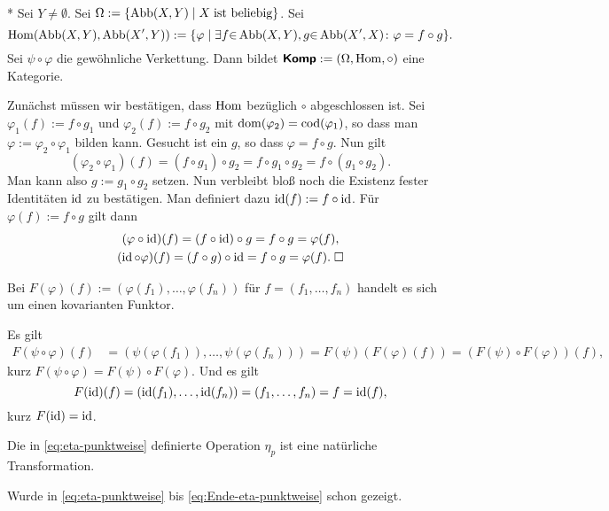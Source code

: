 \begin{Satz}\mbox{}\\*
Sei $Y\ne\emptyset$. Sei $\Omega:=\{\operatorname{Abb}(X,Y)\mid X\;\text{ist beliebig}\}$.
Sei%
\[\operatorname{Hom}(\operatorname{Abb}(X,Y),\operatorname{Abb}(X',Y))
:= \{\varphi\mid\exists f{\in}\operatorname{Abb}(X,Y), g{\in}\operatorname{Abb}(X',X)\colon
\varphi = f\circ g\}.\]
Sei $\psi\circ \varphi$ die gewöhnliche Verkettung. Dann bildet
$\textsf{\textbf{Komp}}:=(\Omega,\operatorname{Hom},\circ)$ eine Kategorie.
\end{Satz}
Zunächst müssen wir bestätigen, dass $\operatorname{Hom}$ bezüglich
$\circ$ abgeschlossen ist. Sei $\varphi_1(f):=f\circ g_1$ und
$\varphi_2(f):=f\circ g_2$ mit $\operatorname{dom}(\varphi_2)=\operatorname{cod}(\varphi_1)$, so
dass man $\varphi:=\varphi_2\circ\varphi_1$ bilden kann.
Gesucht ist ein $g$, so dass $\varphi = f\circ g$. Nun gilt%
\begin{equation}
(\varphi_2\circ\varphi_1)(f) = (f\circ g_1)\circ g_2
= f\circ g_1\circ g_2 = f\circ (g_1\circ g_2).
\end{equation}
Man kann also $g:=g_1\circ g_2$ setzen. Nun verbleibt bloß noch die
Existenz fester Identitäten $\operatorname{id}$ zu bestätigen. Man definiert dazu
$\operatorname{id}(f):=f\circ\operatorname{id}$. Für $\varphi(f):=f\circ g$ gilt dann%
\begin{gather}
(\varphi\circ\operatorname{id})(f) = (f\circ \operatorname{id})\circ g = f\circ g = \varphi(f),\\
(\operatorname{id}\circ\varphi)(f) = (f\circ g)\circ\operatorname{id} = f\circ g = \varphi(f).\;\Box
\end{gather}
\begin{Satz}
Bei $F(\varphi)(f):=(\varphi(f_1),\ldots,\varphi(f_n))$ für
$f=(f_1,\ldots,f_n)$ handelt es sich um einen kovarianten Funktor.
\end{Satz}
 Es gilt
\begin{align}
F(\psi\circ\varphi)(f) &= (\psi(\varphi(f_1)),\ldots,\psi(\varphi(f_n)))
= F(\psi)(F(\varphi)(f))
= (F(\psi)\circ F(\varphi))(f),
\end{align}
kurz $F(\psi\circ\varphi) = F(\psi)\circ F(\varphi)$. Und es gilt
\begin{equation}
F(\operatorname{id})(f) = (\operatorname{id}(f_1),\ldots,\operatorname{id}(f_n)) = (f_1,\ldots,f_n) = f = \operatorname{id}(f),
\end{equation}
kurz $F(\operatorname{id}) = \operatorname{id}$.\;\qedsymbol
\begin{Satz}
Die in \eqref{eq:eta-punktweise} definierte Operation $\eta_p$ ist
eine natürliche Transformation.
\end{Satz}
 Wurde in \eqref{eq:eta-punktweise} bis
\eqref{eq:Ende-eta-punktweise} schon gezeigt.\;\qedsymbol

